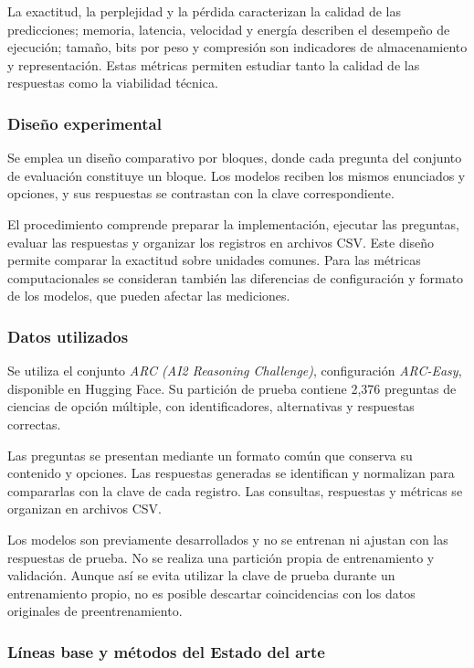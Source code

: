 La exactitud, la perplejidad y la pérdida caracterizan la calidad de las predicciones; memoria, latencia, velocidad y energía describen el desempeño de ejecución; tamaño, bits por peso y compresión son indicadores de almacenamiento y representación. Estas métricas permiten estudiar tanto la calidad de las respuestas como la viabilidad técnica.

\subsubsection{Diseño experimental}

Se emplea un diseño comparativo por bloques, donde cada pregunta del conjunto de evaluación constituye un bloque. Los modelos reciben los mismos enunciados y opciones, y sus respuestas se contrastan con la clave correspondiente.

El procedimiento comprende preparar la implementación, ejecutar las preguntas, evaluar las respuestas y organizar los registros en archivos CSV. Este diseño permite comparar la exactitud sobre unidades comunes. Para las métricas computacionales se consideran también las diferencias de configuración y formato de los modelos, que pueden afectar las mediciones.

\subsubsection{Datos utilizados}

Se utiliza el conjunto \textit{ARC (AI2 Reasoning Challenge)}, configuración \textit{ARC-Easy}, disponible en Hugging Face. Su partición de prueba contiene 2,376 preguntas de ciencias de opción múltiple, con identificadores, alternativas y respuestas correctas.

Las preguntas se presentan mediante un formato común que conserva su contenido y opciones. Las respuestas generadas se identifican y normalizan para compararlas con la clave de cada registro. Las consultas, respuestas y métricas se organizan en archivos CSV.

Los modelos son previamente desarrollados y no se entrenan ni ajustan con las respuestas de prueba. No se realiza una partición propia de entrenamiento y validación. Aunque así se evita utilizar la clave de prueba durante un entrenamiento propio, no es posible descartar coincidencias con los datos originales de preentrenamiento.

\subsubsection{Líneas base y métodos del Estado del arte}

